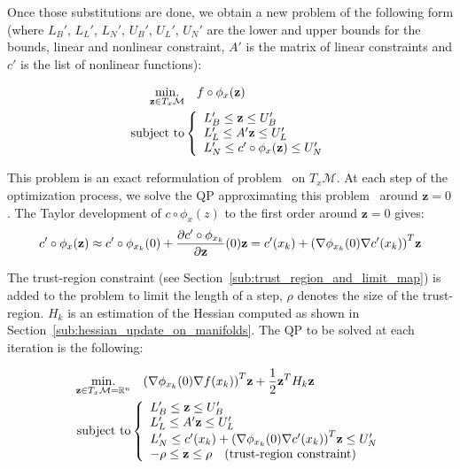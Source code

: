 Once those substitutions are done, we obtain a new problem of the following form (where $L_B'$, $L_L'$, $L_N'$, $U_B'$, $U_L'$, $U_N'$ are the lower and upper bounds for the bounds, linear and nonlinear constraint, $A'$ is the matrix of linear constraints and $c'$ is the list of nonlinear functions):

\begin{align}
\label{eq:optim_txm_final}
  \operatorname*{min.}_{\mathbf{z} \in T_x\mathcal{M}} & \quad f \circ \phi_x(\mathbf{z})\\ \nonumber
  \text{subject to}&\left\{
  \begin{array}{lr}
    L_B' \leq \mathbf{z} \leq U_B' \\
    L_L' \leq A' \mathbf{z} \leq U_L' \\
    L_N' \leq c' \circ \phi_x(\mathbf{z}) \leq U_N'\\
  \end{array}\right.
\end{align}

This problem is an exact reformulation of problem~ on $T_x\mathcal{M}$.
At each step of the optimization process, we solve the QP approximating this problem~ around $\mathbf{z}=0$.
The Taylor development of $c\circ\phi_x(z)$ to the first order around $\mathbf{z} = 0$ gives:
\begin{equation}
  c' \circ \phi_x(\mathbf{z}) \approx c'\circ \phi_{x_k}(0) + \frac{\partial c'\circ \phi_{x_k}}{\partial {\bf z}}(0) {\bf z } = c'(x_k) + {\left(\nabla\phi_{x_k}(0) \nabla c' (x_k)\right)}^T\mathbf{z}
\end{equation}

The trust-region constraint (see Section~\ref{sub:trust_region_and_limit_map}) is added to the problem to limit the length of a step, $\rho$ denotes the size of the trust-region.
$H_k$ is an estimation of the Hessian computed as shown in Section~\ref{sub:hessian_update_on_manifolds}.
The QP to be solved at each iteration is the following:

\begin{align}
  \label{eq:QP_txm}
  \begin{split}
  \operatorname*{min.}_{\mathbf{z} \in T_x\mathcal{M}=\mathbb{R}^n } & \quad {\left(\nabla\phi_{x_k}(0) \nabla f (x_k)\right)}^T\mathbf{z} + \frac{1}{2} {\bf z }^T H_k{\bf z }\\
  \text{subject to}&\left\{
  \begin{array}{lr}
    L_B' \leq \mathbf{z} \leq U_B' \\
    L_L' \leq A' \mathbf{z} \leq U_L' \\
    L_N' \leq c'(x_k) + {\left(\nabla\phi_{x_k}(0) \nabla c' (x_k)\right)}^T\mathbf{z}\leq U_N'\\
    -\rho \leq \mathbf{z} \leq \rho \quad (\text{trust-region constraint}) \\
  \end{array}\right.
  \end{split}
\end{align}

